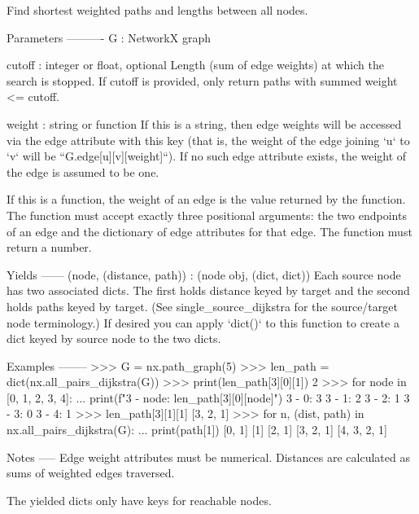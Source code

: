 \begin{DoxyVerb}Find shortest weighted paths and lengths between all nodes.

Parameters
----------
G : NetworkX graph

cutoff : integer or float, optional
    Length (sum of edge weights) at which the search is stopped.
    If cutoff is provided, only return paths with summed weight <= cutoff.

weight : string or function
    If this is a string, then edge weights will be accessed via the
    edge attribute with this key (that is, the weight of the edge
    joining `u` to `v` will be ``G.edge[u][v][weight]``). If no
    such edge attribute exists, the weight of the edge is assumed to
    be one.

    If this is a function, the weight of an edge is the value
    returned by the function. The function must accept exactly three
    positional arguments: the two endpoints of an edge and the
    dictionary of edge attributes for that edge. The function must
    return a number.

Yields
------
(node, (distance, path)) : (node obj, (dict, dict))
    Each source node has two associated dicts. The first holds distance
    keyed by target and the second holds paths keyed by target.
    (See single_source_dijkstra for the source/target node terminology.)
    If desired you can apply `dict()` to this function to create a dict
    keyed by source node to the two dicts.

Examples
--------
>>> G = nx.path_graph(5)
>>> len_path = dict(nx.all_pairs_dijkstra(G))
>>> print(len_path[3][0][1])
2
>>> for node in [0, 1, 2, 3, 4]:
...     print(f"3 - {node}: {len_path[3][0][node]}")
3 - 0: 3
3 - 1: 2
3 - 2: 1
3 - 3: 0
3 - 4: 1
>>> len_path[3][1][1]
[3, 2, 1]
>>> for n, (dist, path) in nx.all_pairs_dijkstra(G):
...     print(path[1])
[0, 1]
[1]
[2, 1]
[3, 2, 1]
[4, 3, 2, 1]

Notes
-----
Edge weight attributes must be numerical.
Distances are calculated as sums of weighted edges traversed.

The yielded dicts only have keys for reachable nodes.
\end{DoxyVerb}
 \mbox{\label{namespacenetworkx_1_1algorithms_1_1shortest__paths_1_1weighted_ab315738b5d893fe6d12f4d7396a4c777}} 
